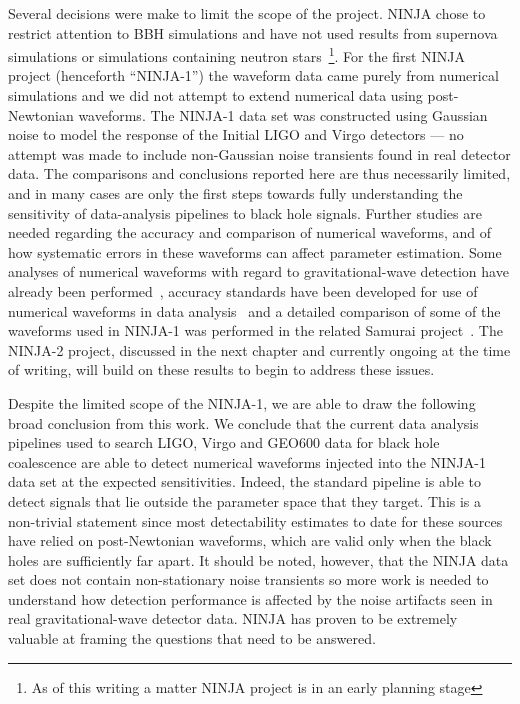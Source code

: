 Several decisions were make to limit the scope of the project.  NINJA
chose to restrict attention to BBH simulations and have not used
results from supernova simulations or simulations containing neutron
stars~\footnote{As of this writing a matter NINJA project is in an
early planning stage}.  For the first NINJA project (henceforth
``NINJA-1'') the waveform data came purely from numerical simulations
and we did not attempt to extend numerical data using post-Newtonian
waveforms.  The NINJA-1 data set was constructed using Gaussian noise
to model the response of the Initial LIGO and Virgo detectors --- no
attempt was made to include non-Gaussian noise transients found in
real detector data.  The comparisons and conclusions reported here are
thus necessarily limited, and in many cases are only the first steps
towards fully understanding the sensitivity of data-analysis pipelines
to black hole signals.  Further studies are needed regarding the
accuracy and comparison of numerical waveforms, and of how systematic
errors in these waveforms can affect parameter estimation.  Some
analyses of numerical waveforms with regard to gravitational-wave
detection have already been
performed~\cite{Baumgarte:2006en,Vaishnav:2007nm,Pan:2007nw,Boyle:2009dg},
accuracy standards have been developed for use of numerical waveforms
in data analysis~\cite{Lindblom:2008cm} and a detailed comparison of
some of the waveforms used in NINJA-1 was performed in the related
Samurai project~\cite{Hannam:2009hh}.  The NINJA-2 project, discussed
in the next chapter and currently ongoing at the time of writing, will
build on these results to begin to address these issues.  

Despite the limited scope of the NINJA-1, we are able to draw the
following broad conclusion from this work.  We conclude that the
current data analysis pipelines used to search LIGO, Virgo and GEO600
data for black hole coalescence are able to detect numerical waveforms
injected into the NINJA-1 data set at the expected sensitivities.
Indeed, the standard pipeline is able to detect signals that lie
outside the parameter space that they target.  This is a non-trivial
statement since most detectability estimates to date for these sources
have relied on post-Newtonian waveforms, which are valid only when the
black holes are sufficiently far apart.  It should be noted, however,
that the NINJA data set does not contain non-stationary noise
transients so more work is needed to understand how detection
performance is affected by the noise artifacts seen in real
gravitational-wave detector data.  NINJA has proven to be extremely
valuable at framing the questions that need to be answered.

